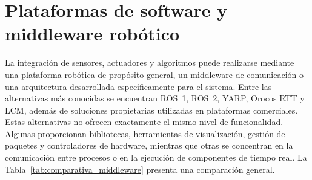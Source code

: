 \section{Plataformas de software y middleware robótico}
\label{sec:alternativas_middleware}

La integración de sensores, actuadores y algoritmos puede realizarse mediante
una plataforma robótica de propósito general, un middleware de comunicación o
una arquitectura desarrollada específicamente para el sistema. Entre las
alternativas más conocidas se encuentran ROS~1, ROS~2, YARP, Orocos RTT y
LCM, además de soluciones propietarias utilizadas en plataformas comerciales.
Estas alternativas no ofrecen exactamente el mismo nivel de funcionalidad.
Algunas proporcionan bibliotecas, herramientas de visualización, gestión de
paquetes y controladores de hardware, mientras que otras se concentran en la
comunicación entre procesos o en la ejecución de componentes de tiempo real.
La Tabla~\ref{tab:comparativa_middleware} presenta una comparación general.

